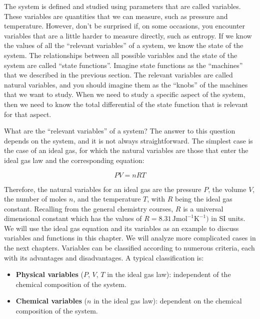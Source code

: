 \documentclass[
  9pt,
]{extbook}
\providecommand{\tightlist}{%
  \setlength{\itemsep}{0pt}\setlength{\parskip}{0pt}}
\theoremstyle{definition}
\theoremstyle{definition}
\theoremstyle{definition}
\theoremstyle{definition}
\theoremstyle{remark}
\begin{document}
The system is defined and studied using parameters that are called variables. These variables are quantities that we can measure, such as pressure and temperature. However, don't be surprised if, on some occasions, you encounter variables that are a little harder to measure directly, such as entropy. If we know the values of all the ``relevant variables'' of a system, we know the state of the system. The relationships between all possible variables and the state of the system are called ``state functions''. Imagine state functions as the ``machines'' that we described in the previous section. The relevant variables are called natural variables, and you should imagine them as the ``knobs'' of the machines that we want to study. When we need to study a specific aspect of the system, then we need to know the total differential of the state function that is relevant for that aspect.

What are the ``relevant variables'' of a system? The answer to this question depends on the system, and it is not always straightforward. The simplest case is the case of an ideal gas, for which the natural variables are those that enter the ideal gas law and the corresponding equation:

\begin{equation}
  PV=nRT       
  \label{eq:idealgaslaworiginal}
\end{equation}

Therefore, the natural variables for an ideal gas are the pressure \(P\), the volume \(V\), the number of moles \(n\), and the temperature \(T\), with \(R\) being the ideal gas constant. Recalling from the general chemistry courses, \(R\) is a universal dimensional constant which has the values of \(R = 8.31 \,\text{J} \text{mol}^{-1} \text{K}^{-1})\) in SI units. We will use the ideal gas equation and its variables as an example to discuss variables and functions in this chapter. We will analyze more complicated cases in the next chapters. Variables can be classified according to numerous criteria, each with its advantages and disadvantages. A typical classification is:

\begin{itemize}
\tightlist
\item
  \textbf{Physical variables} (\(P\), \(V\), \(T\) in the ideal gas law): independent of the chemical composition of the system.
\item
  \textbf{Chemical variables} (\(n\) in the ideal gas law): dependent on the chemical composition of the system.
\end{itemize}
\end{document}
